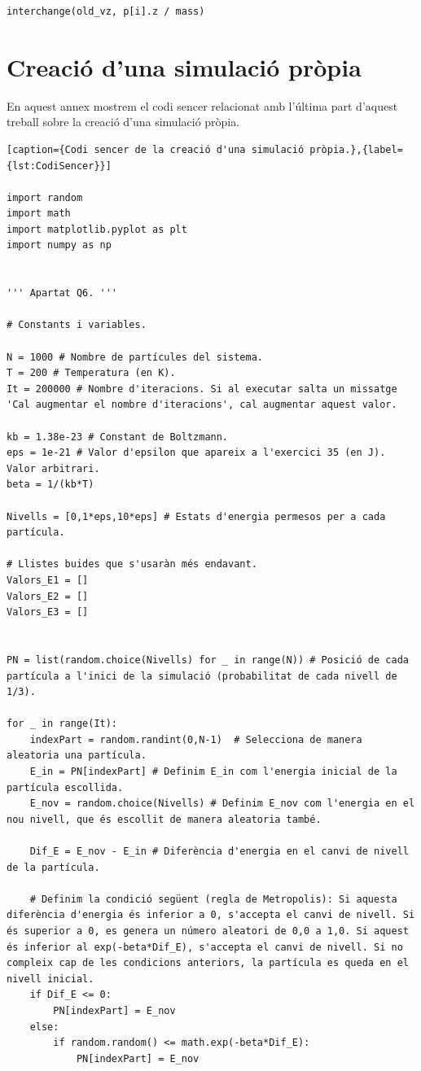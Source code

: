 \documentclass[a4paper,10.5pt]{report}
\begin{document}
\begin{appendices}
\begin{lstlisting}[caption={Distribució de velocitats i posicions en l'eix Z pel sistema amb camp gravitatori (col·lectivitat NVE).}]
interchange(old_vz, p[i].z / mass)
	\end{lstlisting}
	
	\section{Creació d'una simulació pròpia}
	\label{annex:2}
	En aquest annex mostrem el codi sencer relacionat amb l'última part d'aquest treball sobre la creació d'una simulació pròpia.
	
	\begin{lstlisting}[caption={Codi sencer de la creació d'una simulació pròpia.},{label={lst:CodiSencer}}]
		
import random
import math
import matplotlib.pyplot as plt
import numpy as np


''' Apartat Q6. '''

# Constants i variables.

N = 1000 # Nombre de partícules del sistema.
T = 200 # Temperatura (en K).
It = 200000 # Nombre d'iteracions. Si al executar salta un missatge 'Cal augmentar el nombre d'iteracions', cal augmentar aquest valor. 

kb = 1.38e-23 # Constant de Boltzmann.
eps = 1e-21 # Valor d'epsilon que apareix a l'exercici 35 (en J). Valor arbitrari. 
beta = 1/(kb*T)

Nivells = [0,1*eps,10*eps] # Estats d'energia permesos per a cada partícula. 

# Llistes buides que s'usaràn més endavant.
Valors_E1 = []
Valors_E2 = []
Valors_E3 = []


PN = list(random.choice(Nivells) for _ in range(N)) # Posició de cada partícula a l'inici de la simulació (probabilitat de cada nivell de 1/3).

for _ in range(It): 
	indexPart = random.randint(0,N-1)  # Selecciona de manera aleatoria una partícula.
	E_in = PN[indexPart] # Definim E_in com l'energia inicial de la partícula escollida.
	E_nov = random.choice(Nivells) # Definim E_nov com l'energia en el nou nivell, que és escollit de manera aleatoria també.

	Dif_E = E_nov - E_in # Diferència d'energia en el canvi de nivell de la partícula.
	
	# Definim la condició següent (regla de Metropolis): Si aquesta diferència d'energia és inferior a 0, s'accepta el canvi de nivell. Si és superior a 0, es genera un número aleatori de 0,0 a 1,0. Si aquest és inferior al exp(-beta*Dif_E), s'accepta el canvi de nivell. Si no compleix cap de les condicions anteriors, la partícula es queda en el nivell inicial. 
	if Dif_E <= 0: 
		PN[indexPart] = E_nov
	else:
		if random.random() <= math.exp(-beta*Dif_E):
			PN[indexPart] = E_nov
		

\end{lstlisting}
\end{appendices}
\end{document}
